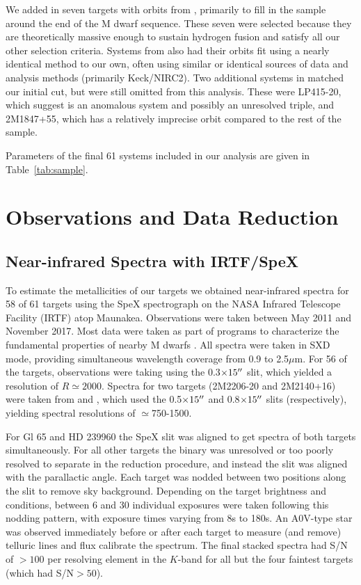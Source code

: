 \documentclass[twocolumn]{aastex62}
\begin{document}
We added in seven targets with orbits from \citet{Dupuy2017}, primarily to fill in the sample around the end of the M dwarf sequence. These seven were selected because they are theoretically massive enough to sustain hydrogen fusion and satisfy all our other selection criteria. Systems from \citet{Dupuy2017} also had their orbits fit using a nearly identical method to our own, often using similar or identical sources of data and analysis methods (primarily Keck/NIRC2). Two additional systems in \citet{Dupuy2017} matched our initial cut, but were still omitted from this analysis. These were LP415-20, which \citet{Dupuy2017} suggest is an anomalous system and possibly an unresolved triple, and 2M1847+55, which has a relatively imprecise orbit compared to the rest of the sample.

Parameters of the final 61 systems included in our analysis are given in Table~\ref{tab:sample}.

\section{Observations and Data Reduction}\label{sec:obs} 

\subsection{Near-infrared Spectra with IRTF/SpeX}

To estimate the metallicities of our targets we obtained near-infrared spectra for 58 of 61 targets using the SpeX spectrograph \citep{Rayner:2003} on the NASA Infrared Telescope Facility (IRTF) atop Maunakea. Observations were taken between May 2011 and November 2017. Most data were taken as part of programs to characterize the fundamental properties of nearby M dwarfs \citep[e.g.,][]{Mann2013c,Gaidos2014,Terrien2015}. All spectra were taken in SXD mode, providing simultaneous wavelength coverage from 0.9 to 2.5$\mu$m. For 56 of the targets, observations were taking using the 0.3$\times15\mbox{$^{\prime\prime}$}$ slit, which yielded a resolution of $R\simeq2000$. Spectra for two targets (2M2206-20 and 2M2140+16) were taken from \citet{2009ApJ...706..328D} and \citet{Dupuy2012}, which used the 0.5$\times15\mbox{$^{\prime\prime}$}$ and 0.8$\times15\mbox{$^{\prime\prime}$}$ slits (respectively), yielding spectral resolutions of $\simeq$750-1500. 

For Gl 65 and HD 239960 the SpeX slit was aligned to get spectra of both targets simultaneously. For all other targets the binary was unresolved or too poorly resolved to separate in the reduction procedure, and instead the slit was aligned with the parallactic angle. Each target was nodded between two positions along the slit to remove sky background. Depending on the target brightness and conditions, between 6 and 30 individual exposures were taken following this nodding pattern, with exposure times varying from 8s to 180s. An A0V-type star was observed immediately before or after each target to measure (and remove) telluric lines and flux calibrate the spectrum. The final stacked spectra had S/N of $>100$ per resolving element in the $K$-band for all but the four faintest targets (which had S/N$>50$). 
\end{document}
